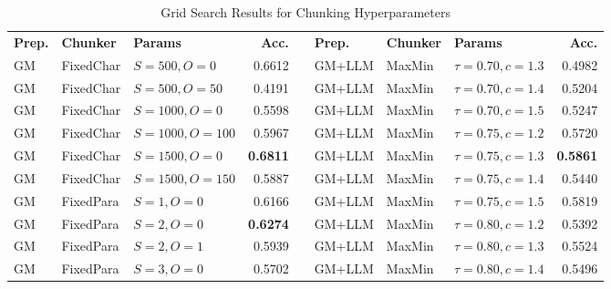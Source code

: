 \documentclass[12pt]{article} %
\begin{document}
\begin{table}[htbp]
    \centering
    \caption{Grid Search Results for Chunking Hyperparameters}
    \label{tab:chunking_hyperparameters}
    \scriptsize
    \setlength{\tabcolsep}{3pt} %
    \begin{tabular}{lll r c lll r}
        \toprule
        \textbf{Prep.} & \textbf{Chunker} & \textbf{Params}     & \textbf{Acc.}   & \quad & \textbf{Prep.} & \textbf{Chunker} & \textbf{Params}        & \textbf{Acc.}   \\
        \cmidrule{1-4} \cmidrule{6-9}
        GM             & FixedChar        & $S{=}500, O{=}0$    & 0.6612          &       & GM+LLM         & MaxMin           & $\tau{=}0.70, c{=}1.3$ & 0.4982          \\
        GM             & FixedChar        & $S{=}500, O{=}50$   & 0.4191          &       & GM+LLM         & MaxMin           & $\tau{=}0.70, c{=}1.4$ & 0.5204          \\
        GM             & FixedChar        & $S{=}1000, O{=}0$   & 0.5598          &       & GM+LLM         & MaxMin           & $\tau{=}0.70, c{=}1.5$ & 0.5247          \\
        GM             & FixedChar        & $S{=}1000, O{=}100$ & 0.5967          &       & GM+LLM         & MaxMin           & $\tau{=}0.75, c{=}1.2$ & 0.5720          \\
        GM             & FixedChar        & $S{=}1500, O{=}0$   & \textbf{0.6811} &       & GM+LLM         & MaxMin           & $\tau{=}0.75, c{=}1.3$ & \textbf{0.5861} \\
        GM             & FixedChar        & $S{=}1500, O{=}150$ & 0.5887          &       & GM+LLM         & MaxMin           & $\tau{=}0.75, c{=}1.4$ & 0.5440          \\
        \cmidrule(r){1-4}
        GM             & FixedPara        & $S{=}1, O{=}0$      & 0.6166          &       & GM+LLM         & MaxMin           & $\tau{=}0.75, c{=}1.5$ & 0.5819          \\
        GM             & FixedPara        & $S{=}2, O{=}0$      & \textbf{0.6274} &       & GM+LLM         & MaxMin           & $\tau{=}0.80, c{=}1.2$ & 0.5392          \\
        GM             & FixedPara        & $S{=}2, O{=}1$      & 0.5939          &       & GM+LLM         & MaxMin           & $\tau{=}0.80, c{=}1.3$ & 0.5524          \\
        GM             & FixedPara        & $S{=}3, O{=}0$      & 0.5702          &       & GM+LLM         & MaxMin           & $\tau{=}0.80, c{=}1.4$ & 0.5496          \\

\end{tabular}
\end{table}
\end{document}
